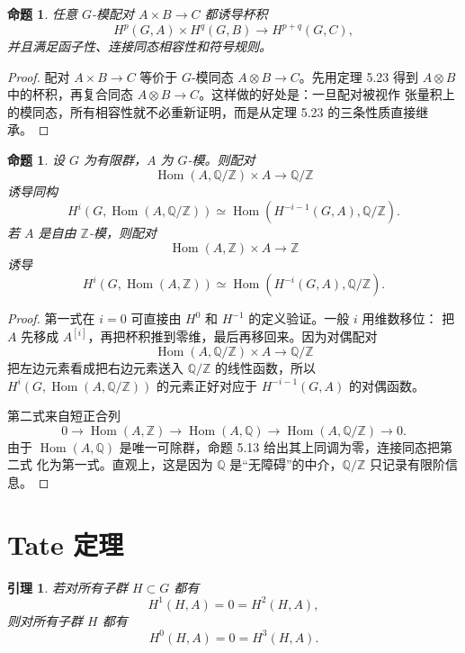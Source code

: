 \documentclass[11pt,a4paper,openany]{ctexbook}
\numberwithin{equation}{chapter}
\newcommand{\Q}{\mathbb{Q}}
\newcommand{\Z}{\mathbb{Z}}
\theoremstyle{plain}
\newtheorem{proposition}[theorem]{命题}
\newtheorem{lemma}[theorem]{引理}
\theoremstyle{definition}
\theoremstyle{remark}
\begin{document}
\begin{proposition}
任意 $G$-模配对 $A\times B\to C$ 都诱导杯积
\[
 H^p(G,A)\times H^q(G,B)\to H^{p+q}(G,C),
\]
并且满足函子性、连接同态相容性和符号规则。
\end{proposition}

\begin{proof}
配对 $A\times B\to C$ 等价于 $G$-模同态 $A\otimes B\to C$。先用定理 5.23 得到
$A\otimes B$ 中的杯积，再复合同态 $A\otimes B\to C$。这样做的好处是：一旦配对被视作
张量积上的模同态，所有相容性就不必重新证明，而是从定理 5.23 的三条性质直接继承。
\end{proof}

\begin{proposition}
设 $G$ 为有限群，$A$ 为 $G$-模。则配对
\[
 \operatorname{Hom}(A,\Q/\Z)\times A\to\Q/\Z
\]
诱导同构
\[
 H^i(G,\operatorname{Hom}(A,\Q/\Z))
 \simeq \operatorname{Hom}(H^{-i-1}(G,A),\Q/\Z).
\]
若 $A$ 是自由 $\Z$-模，则配对
\[
 \operatorname{Hom}(A,\Z)\times A\to\Z
\]
诱导
\[
 H^i(G,\operatorname{Hom}(A,\Z))
 \simeq \operatorname{Hom}(H^{-i}(G,A),\Q/\Z).
\]
\end{proposition}

\begin{proof}
第一式在 $i=0$ 可直接由 $H^0$ 和 $H^{-1}$ 的定义验证。一般 $i$ 用维数移位：
把 $A$ 先移成 $A^{[i]}$，再把杯积推到零维，最后再移回来。因为对偶配对
\[
 \operatorname{Hom}(A,\Q/\Z)\times A\to\Q/\Z
\]
把左边元素看成把右边元素送入 $\Q/\Z$ 的线性函数，所以
$H^i(G,\operatorname{Hom}(A,\Q/\Z))$ 的元素正好对应于
$H^{-i-1}(G,A)$ 的对偶函数。

第二式来自短正合列
\[
 0\to\operatorname{Hom}(A,\Z)\to\operatorname{Hom}(A,\Q)
 \to\operatorname{Hom}(A,\Q/\Z)\to0.
\]
由于 $\operatorname{Hom}(A,\Q)$ 是唯一可除群，命题 5.13 给出其上同调为零，连接同态把第二式
化为第一式。直观上，这是因为 $\Q$ 是“无障碍”的中介，$\Q/\Z$ 只记录有限阶信息。
\end{proof}

\section{Tate 定理}

\begin{lemma}
若对所有子群 $H\subset G$ 都有
\[
 H^1(H,A)=0=H^2(H,A),
\]
则对所有子群 $H$ 都有
\[
 H^0(H,A)=0=H^3(H,A).
\]
\end{lemma}
\end{document}
